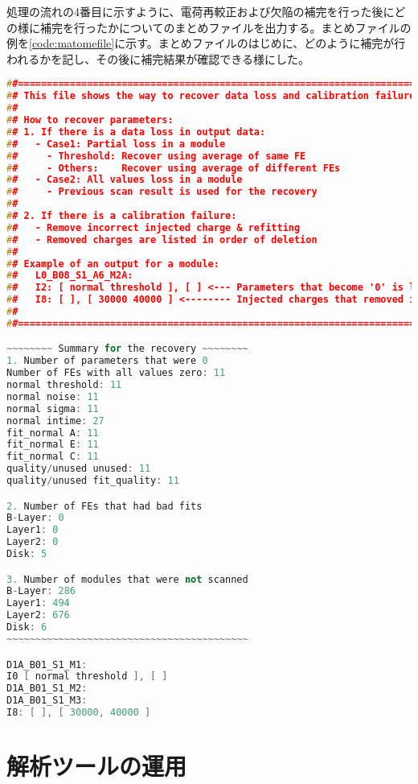 処理の流れの4番目に示すように、電荷再較正および欠陥の補完を行った後にどの様に補完を行ったかについてのまとめファイルを出力する。まとめファイルの例を\cref{code:matomefile}に示す。まとめファイルのはじめに、どのように補完が行われるかを記し、その後に補完結果が確認できる様にした。

\begin{lstlisting}[caption=解析ツールにより出力される補完結果のまとめ。,label=code:matomefile, language=C++]
##===========================================================================
## This file shows the way to recover data loss and calibration failure.
##
## How to recover parameters:
## 1. If there is a data loss in output data:
##   - Case1: Partial loss in a module
##     - Threshold: Recover using average of same FE
##     - Others:    Recover using average of different FEs
##   - Case2: All values loss in a module
##     - Previous scan result is used for the recovery
##
## 2. If there is a calibration failure:
##   - Remove incorrect injected charge & refitting
##   - Removed charges are listed in order of deletion
##
## Example of an output for a module:
##   L0_B08_S1_A6_M2A:
##   I2: [ normal threshold ], [ ] <--- Parameters that become '0' is listed
##   I8: [ ], [ 30000 40000 ] <-------- Injected charges that removed is listed
##
##===========================================================================

~~~~~~~~ Summary for the recovery ~~~~~~~~
1. Number of parameters that were 0
Number of FEs with all values zero: 11
normal threshold: 11
normal noise: 11
normal sigma: 11
normal intime: 27
fit_normal A: 11
fit_normal E: 11
fit_normal C: 11
quality/unused unused: 11
quality/unused fit_quality: 11

2. Number of FEs that had bad fits
B-Layer: 0
Layer1: 0
Layer2: 0
Disk: 5

3. Number of modules that were not scanned
B-Layer: 286
Layer1: 494
Layer2: 676
Disk: 6
~~~~~~~~~~~~~~~~~~~~~~~~~~~~~~~~~~~~~~~~~~

D1A_B01_S1_M1:
I0 [ normal threshold ], [ ]
D1A_B01_S1_M2:
D1A_B01_S1_M3:
I8: [ ], [ 30000, 40000 ]
\end{lstlisting}



\section{解析ツールの運用}
\label{sec:unnyou}

